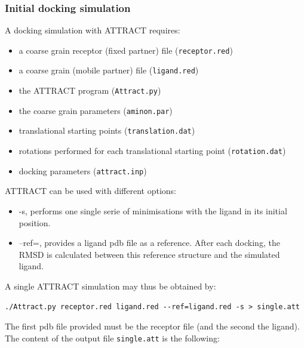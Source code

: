 \documentclass[12pt,a4paper]{article}
\begin{document}
\subsubsection{Initial docking simulation}

A docking simulation with ATTRACT requires:
\begin{itemize}
\item a coarse grain receptor (fixed partner) file ({\tt receptor.red})
\item a coarse grain (mobile partner) file ({\tt ligand.red})
\item the ATTRACT program ({\tt  Attract.py})
\item the coarse grain parameters ({\tt aminon.par})
\item translational starting points ({\tt translation.dat})
\item rotations performed for each translational starting point ({\tt rotation.dat})
\item docking parameters ({\tt attract.inp})
\end{itemize}

ATTRACT can be used with different options:
\begin{itemize}
\item -s, performs one single serie of minimisations with the ligand in its initial position.
\item --ref=, provides a ligand pdb file as a reference. After each docking, the RMSD is calculated between this reference structure and the simulated ligand.
\end{itemize}

A single ATTRACT simulation may thus be obtained by:
\begin{verbatim}
./Attract.py receptor.red ligand.red --ref=ligand.red -s > single.att
\end{verbatim}

The first pdb file provided must be the receptor file (and the second the ligand).
The content of the output file {\tt single.att} is the following:
\end{document}
